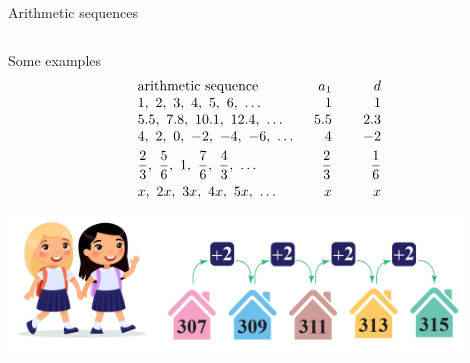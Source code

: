 \documentclass[9pt,aspectratio=169]{beamer}
\begin{document}
\begin{frame}{Arithmetic sequences}
\begin{columns}[T]
\begin{column}{0.5\textwidth}
      Some examples
      \[
        \begin{array}{l r r}
          \text{arithmetic sequence}\hspace*{3em} & a_1 & \hspace*{2em}d \\
          1,\ 2,\ 3,\ 4,\ 5,\ 6,\ \ldots & 1 & 1 \\
          5.5,\ 7.8,\ 10.1,\ 12.4,\ \ldots & 5.5 & 2.3 \\
          4,\ 2,\ 0,\ -2,\ -4,\ -6,\ \ldots & 4 & -2 \\[0.4em]
          \dfrac{2}{3},\ \dfrac{5}{6},\ 1,\ \dfrac{7}{6},\ \dfrac{4}{3},\ \ldots & \dfrac{2}{3} & \dfrac{1}{6} \\[0.7em]
          x,\ 2x,\ 3x,\ 4x,\ 5x,\ \ldots & x & x
        \end{array}
      \]
      \begin{center}
        \vspace*{-1\baselineskip}
        \includegraphics[width=0.9\textwidth]{06 - Arithmetic Sequences/street.png}
      \end{center}
    \end{column}
  \end{columns}
\end{frame}
\end{document}
